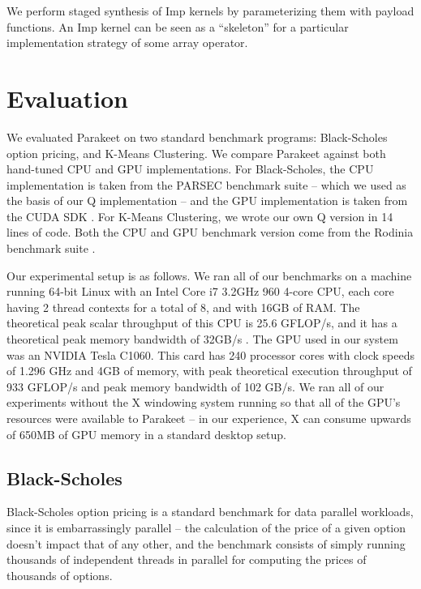 \documentclass[preprint]{sigplanconf}
\begin{document}
We perform staged synthesis of Imp kernels by parameterizing them with payload functions. An Imp kernel can be seen as a ``skeleton'' \cite{Cole04} for a particular implementation strategy of some array operator.  

\section{Evaluation}
\label{Evaluation}

We evaluated Parakeet on two standard benchmark programs: Black-Scholes option pricing, and K-Means Clustering.  We compare Parakeet against both hand-tuned CPU and GPU implementations.  For Black-Scholes, the CPU implementation is taken from the PARSEC \cite{Bien08} benchmark suite -- which we used as the basis
of our Q implementation -- and the GPU implementation is taken from the CUDA SDK \cite{NvidSD}.  For K-Means Clustering, we wrote our own Q version in 14 lines of code.  Both the CPU and GPU benchmark version come from the Rodinia benchmark suite \cite{Che09}.

Our experimental setup is as follows.  We ran all of our benchmarks on a machine running 64-bit Linux with an Intel Core i7 3.2GHz 960 4-core CPU, each core having 2 thread contexts for a total of 8, and with 16GB of RAM.  The theoretical peak scalar throughput of this CPU is 25.6 GFLOP/s, and it has a theoretical peak memory bandwidth of 32GB/s \cite{Lee10}.  The GPU used in our system was an NVIDIA Tesla C1060. This card has 240 processor cores with clock speeds of 1.296 GHz and 4GB of memory, with peak theoretical execution throughput of 933 GFLOP/s and peak memory bandwidth of 102 GB/s.  We ran all of our experiments without the X windowing system running so that all of the GPU's resources were available to Parakeet -- in our experience, X can consume upwards of 650MB of GPU memory in a standard desktop setup.

\subsection{Black-Scholes}
\label{results-bs}


Black-Scholes option pricing \cite{Blac73} is a standard benchmark for data parallel workloads, since it is embarrassingly parallel -- the calculation of the price of a given option doesn't impact that of any other, and the benchmark consists of simply running thousands of independent threads in parallel for computing the prices of thousands of options.
\end{document}
